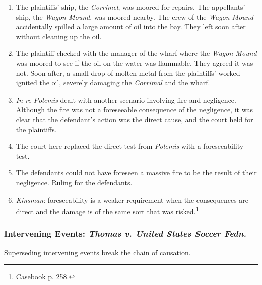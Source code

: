 \begin{enumerate}
    \item The plaintiffs' ship, the \emph{Corrimel}, was moored for repairs. 
    The appellants' ship, the \emph{Wagon Mound}, was moored nearby. The crew 
    of the \emph{Wagon Mound} accidentally spilled a large amount of oil into 
    the bay. They left soon after without cleaning up the oil.
    \item The plaintiff checked with the manager of the wharf where the 
    \emph{Wagon Mound} was moored to see if the oil on the water was 
    flammable. They agreed it was not. Soon after, a small drop of molten 
    metal from the plaintiffs' worked ignited the oil, severely damaging the 
    \emph{Corrimal} and the wharf.
    \item \emph{In re Polemis} dealt with another scenario involving fire and 
    negligence. Although the fire was not a foreseeable consequence of the 
    negligence, it was clear that the defendant's action was the direct cause, 
    and the court held for the plaintiffs.
    \item The court here replaced the direct test from \emph{Polemis} with a 
    foreseeability test.
    \item The defendants could not have foreseen a massive fire to be the 
    result of their negligence. Ruling for the defendants.
    \item \emph{Kinsman}: foreseeability is a weaker requirement when the 
    consequences are direct and the damage is of the same sort that was 
    risked.\footnote{Casebook p. 258.}
\end{enumerate}

\subsubsection{Intervening Events: \emph{Thomas v. United States Soccer 
Fedn.}}

Superseding intervening events break the chain of causation.

